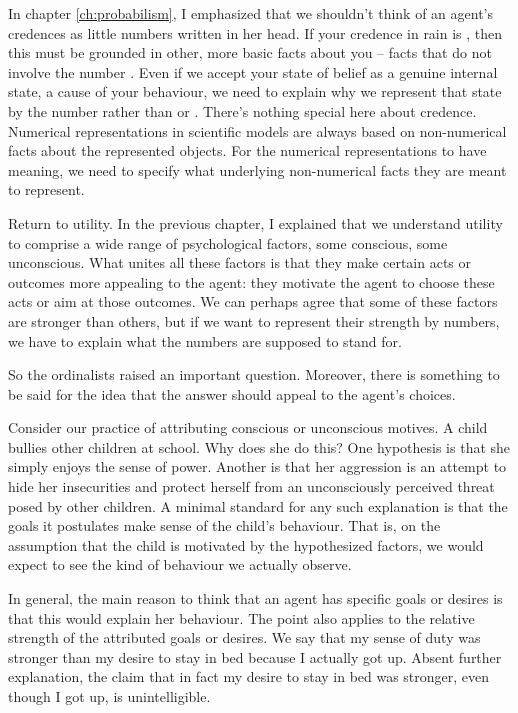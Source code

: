 In chapter \ref{ch:probabilism}, I emphasized that we shouldn't think
of an agent's credences as little numbers written in her head. If your
credence in rain is , then this must be grounded in
other, more basic facts about you -- facts that do not involve the
number . Even if we accept your state of belief as a
genuine internal state, a cause of your behaviour, we need to explain
why we represent that state by the number  rather than
 or . There's nothing special here
about credence. Numerical representations in scientific models are
always based on non-numerical facts about the represented
objects. For the numerical representations to have meaning, we need to
specify what underlying non-numerical facts they are meant to represent.

Return to utility. In the previous chapter, I explained that we
understand utility to comprise a wide range of psychological factors,
some conscious, some unconscious. What unites all these factors is
that they make certain acts or outcomes more appealing to the agent:
they motivate the agent to choose these acts or aim at those
outcomes. We can perhaps agree that some of these factors are stronger
than others, but if we want to represent their strength by numbers, we
have to explain what the numbers are supposed to stand for.

So the ordinalists raised an important question. Moreover, there is
something to be said for the idea that the answer should appeal to
the agent's choices. 

Consider our practice of attributing conscious or unconscious
motives. A child bullies other children at school. Why does she do
this? One hypothesis is that she simply enjoys the sense of
power. Another is that her aggression is an attempt to hide her
insecurities and protect herself from an unconsciously perceived
threat posed by  other children. A minimal standard for any such
explanation is that the goals it postulates make sense of the child's
behaviour. That is, on the assumption that the child is motivated by
the hypothesized factors, we would expect to see the kind of behaviour
we actually observe.

In general, the main reason to think that an agent has specific goals
or desires is that this would explain her behaviour. The point also
applies to the relative strength of the attributed goals or
desires. We say that my sense of duty was stronger than my desire to
stay in bed because I actually got up. Absent further explanation, the
claim that in fact my desire to stay in bed was stronger, even though
I got up, is unintelligible.

